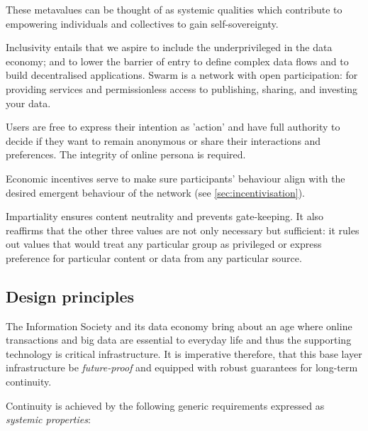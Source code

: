 These metavalues can be thought of as systemic qualities which contribute to empowering individuals and collectives to gain self-sovereignty.

Inclusivity entails that we aspire to include the underprivileged in the data economy; and to lower the barrier of entry to define complex data flows and to build decentralised applications. Swarm is a network with open participation: for providing services and permissionless access to publishing, sharing, and investing your data.

Users are free to express their intention as 'action' and have full authority to decide if they want to remain anonymous or share their interactions and preferences. The integrity of online persona is required. 

Economic incentives serve to make sure participants' behaviour align with the desired emergent behaviour of the network (see \ref{sec:incentivisation}). 

Impartiality ensures content neutrality and prevents gate-keeping. It also reaffirms that the other three values are not only necessary but sufficient: it rules out values that would treat any particular group as privileged or express preference for particular content or data from any particular source. 

\subsection{Design principles \statusorange}\label{sec:design-principles}
 

The Information Society and its data economy bring about an age where online transactions and big data are essential to everyday life and thus the supporting technology is critical infrastructure. It is imperative therefore, that this base layer infrastructure be \emph{future-proof} and equipped with robust guarantees for long-term continuity. 

Continuity is achieved by the following generic requirements expressed as \emph{systemic properties}:

